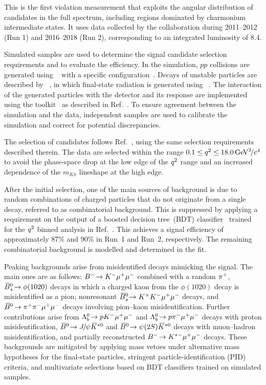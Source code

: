 This is the first \CP violation measurement that exploits the angular distribution of \BdbToKstbMuMu candidates in the full \qsq spectrum, including regions dominated by charmonium intermediate states. It uses \proton\proton data collected by the \lhcb collaboration during 2011--2012 (Run 1) and 2016--2018 (Run 2), corresponding to an integrated luminosity of 8.4\invfb.

Simulated samples are used to determine the signal candidate selection requirements and to evaluate the efficiency. In the simulation, $pp$ collisions are generated using \pythia~\cite{Sjostrand:2007gs} with a specific \lhcb configuration~\cite{LHCb-PROC-2010-056}. Decays of unstable particles are described by \evtgen~\cite{Lange:2001uf}, in which final-state radiation is generated using \photos~\cite{davidson2015photos}. The interaction of the generated particles with the detector and its response are implemented using the \geant toolkit~\cite{Allison:2006ve, *Agostinelli:2002hh} as described in Ref.~\cite{LHCb-PROC-2011-006}. To ensure agreement between the simulation and the data, independent samples are used to calibrate the simulation and correct for potential discrepancies.

The selection of \BdbToKstbMuMu candidates follows Ref.~\cite{LHCb-PAPER-2024-011}, using the same selection requirements described therein. The data are selected within the range $0.1 \leq{\ensuremath{q^2}} \leq 18.0\text{\,Ge\kern -0.1em V}^2\!/c^4$ to avoid the phase-space drop at the low edge of the ${q^2}$ range and an increased \qsq dependence of the $m_{K\pi}$ lineshape at the high edge.

After the initial selection, one of the main sources of background is due to random combinations of charged particles that do not originate from a single decay, referred to as combinatorial background. This is suppressed by applying a requirement on the output of a boosted decision tree~(BDT) classifier~\cite{Breiman,AdaBoost} trained for the ${q^2}$ binned analysis in Ref.~\cite{LHCb-PAPER-2025-041}. This achieves a signal efficiency of approximately 87\% and 90\% in Run~1 and Run~2, respectively. The remaining combinatorial background is modelled and determined in the fit.

Peaking backgrounds arise from misidentified decays mimicking the signal. The main ones are as follows: ${{B}^-}\!\rightarrow {\ensuremath{{K}^-}}{\ensuremath{\mu^+\mu^-}}$ combined with a random ${{\pi}^+}$, ${{\kern 0.18em\overline{\kern -0.18em B}}{}^0_{s}}\!\rightarrow \phi(1020)$ decays in which a charged kaon from the $\phi(1020)$ decay is misidentified as a pion; nonresonant ${{\kern 0.18em\overline{\kern -0.18em B}}{}^0_{s}}\!\rightarrow {\ensuremath{{K}^+}}{\ensuremath{{K}^-}}{\ensuremath{\mu^+\mu^-}}$ decays, and ${{\kern 0.18em\overline{\kern -0.18em B}}{}^0}\!\rightarrow {\ensuremath{{\pi}^+}}{\ensuremath{{\pi}^-}}{\ensuremath{\mu^+\mu^-}}$ decays involving pion--kaon misidentification. Further contributions arise from ${{\Lambda}^0_{b}}\!\rightarrow {\ensuremath{p}} {\ensuremath{{K}^-}} {\ensuremath{\mu^+\mu^-}}$ and ${{\Lambda}^0_{b}}\!\rightarrow {\ensuremath{p}} {\ensuremath{{\pi}^-}} {\ensuremath{\mu^+\mu^-}}$ decays with proton misidentification, ${{\kern 0.18em\overline{\kern -0.18em B}}{}^0}\!\rightarrow {\ensuremath{{J\mskip -3mu/\mskip -2mu\psi}}}{\ensuremath{{\kern 0.18em\overline{\kern -0.18em K}}{}^{*0}}}$ and ${{\kern 0.18em\overline{\kern -0.18em B}}{}^0}\!\rightarrow {\ensuremath{\psi{(2S)}}}{\ensuremath{{\kern 0.18em\overline{\kern -0.18em K}}{}^{*0}}}$ decays with muon--hadron misidentification, and partially reconstructed ${{B}^-}\!\rightarrow {\ensuremath{{K}^{*-}}}{\ensuremath{\mu^+\mu^-}}$ decays.
These backgrounds are mitigated by applying mass vetoes under alternative mass hypotheses for the final-state particles, stringent particle-identification (PID) criteria, and multivariate selections based on BDT classifiers trained on simulated samples.

